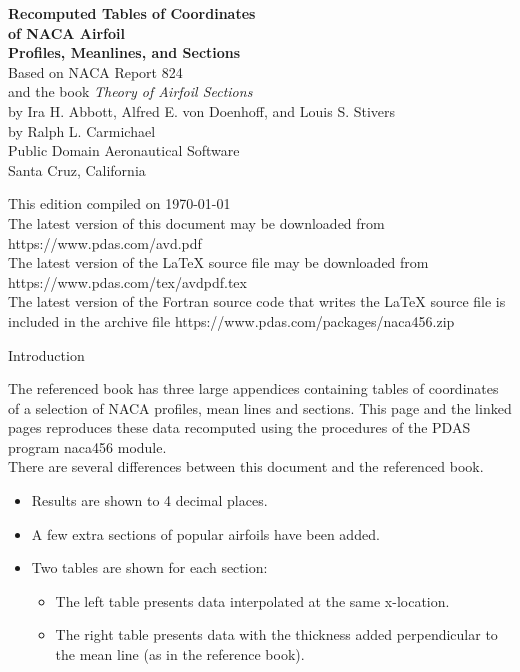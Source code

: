 \documentclass[11pt]{book}
\begin{document}
 \begin{center}
 \vspace{8mm}
 \Huge
 \textbf{Recomputed Tables of Coordinates} \\
 \textbf{of NACA Airfoil} \\
 \textbf{Profiles, Meanlines, and Sections}\\
 \vspace{8mm}
 \large
 Based on NACA Report 824 \\and the book \textit{Theory of Airfoil Sections}\\
 by Ira H. Abbott, Alfred E. von Doenhoff, and Louis S. Stivers\\
 \vspace{70mm}
 \LARGE
 by Ralph L. Carmichael\\
 \vspace{8mm}
 \Large
 Public Domain Aeronautical Software
 \\Santa Cruz, California \\
 \end{center}
 \newpage
 This edition compiled on \today \\
 The latest version of this document may be downloaded from 
  https://www.pdas.com/avd.pdf \\
 The latest version of the LaTeX source file may be downloaded from 
  https://www.pdas.com/tex/avdpdf.tex \\
 The latest version of the Fortran source code that writes the 
  LaTeX source file is included in the archive file 
  https://www.pdas.com/packages/naca456.zip \\
 \newpage
 \begin{center} \Large Introduction \normalsize \end{center}
 The referenced book has three large appendices
 containing tables of coordinates of a selection of NACA
 profiles, mean lines and sections.
 This page and the linked pages reproduces these data
 recomputed using the procedures of the PDAS program naca456
 module.  \\
 There are several differences between this document and the
 referenced book.
 \begin{itemize}
 \item Results are shown to 4 decimal places.
 \item A few extra sections of popular airfoils have been added.
 \item Two tables are shown for each section:
 \begin{itemize}
 \item The left table presents data interpolated at the same x-location.
 \item The right table presents data with the thickness added 
 perpendicular to the mean line (as in the reference book).
 \end{itemize}
 \end{itemize}
\end{document}
